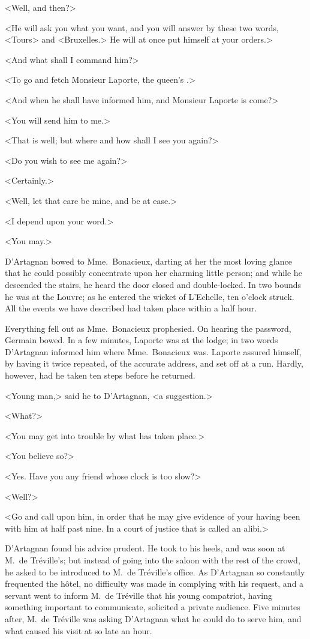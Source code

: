 <Well, and then?> 

<He will ask you what you want, and you will answer by these two words, <Tours> and <Bruxelles.> He will at once put himself at your orders.> 

<And what shall I command him?> 

<To go and fetch Monsieur Laporte, the queen's .> 

<And when he shall have informed him, and Monsieur Laporte is come?> 

<You will send him to me.> 

<That is well; but where and how shall I see you again?> 

<Do you wish to see me again?> 

<Certainly.> 

<Well, let that care be mine, and be at ease.> 

<I depend upon your word.> 

<You may.> 

D'Artagnan bowed to Mme.~Bonacieux, darting at her the most loving glance that he could possibly concentrate upon her charming little person; and while he descended the stairs, he heard the door closed and double-locked. In two bounds he was at the Louvre; as he entered the wicket of L'Echelle, ten o'clock struck. All the events we have described had taken place within a half hour. 

Everything fell out as Mme.~Bonacieux prophesied. On hearing the password, Germain bowed. In a few minutes, Laporte was at the lodge; in two words D'Artagnan informed him where Mme.~Bonacieux was. Laporte assured himself, by having it twice repeated, of the accurate address, and set off at a run. Hardly, however, had he taken ten steps before he returned. 

<Young man,> said he to D'Artagnan, <a suggestion.> 

<What?> 

<You may get into trouble by what has taken place.> 

<You believe so?> 

<Yes. Have you any friend whose clock is too slow?> 

<Well?> 

<Go and call upon him, in order that he may give evidence of your having been with him at half past nine. In a court of justice that is called an alibi.> 

D'Artagnan found his advice prudent. He took to his heels, and was soon at M.~de Tréville's; but instead of going into the saloon with the rest of the crowd, he asked to be introduced to M.~de Tréville's office. As D'Artagnan so constantly frequented the hôtel, no difficulty was made in complying with his request, and a servant went to inform M.~de Tréville that his young compatriot, having something important to communicate, solicited a private audience. Five minutes after, M.~de Tréville was asking D'Artagnan what he could do to serve him, and what caused his visit at so late an hour. 

